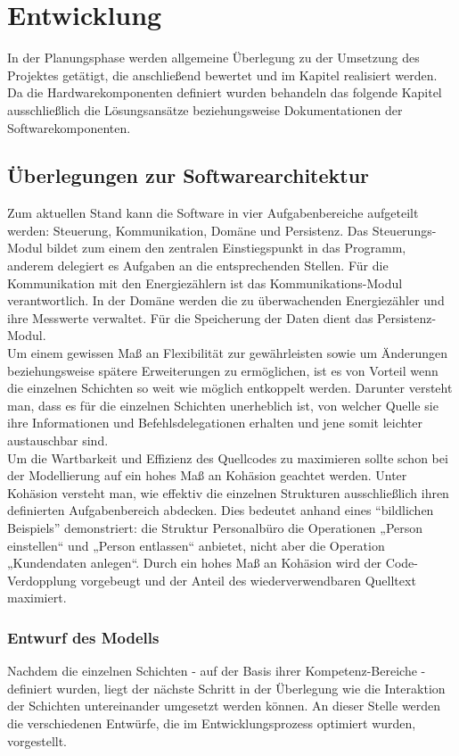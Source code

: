 \documentclass[Bachelorarbeit.tex]{subfiles}
\begin{document}
\chapter{Entwicklung}
In der Planungsphase werden allgemeine Überlegung zu der Umsetzung 
des Projektes getätigt, die anschließend bewertet und im Kapitel 
 realisiert werden. Da die Hardwarekomponenten definiert wurden 
behandeln das folgende Kapitel ausschließlich die Lösungsansätze 
beziehungsweise Dokumentationen der Softwarekomponenten.

\section{Überlegungen zur Softwarearchitektur}
Zum aktuellen Stand kann die Software in vier Aufgabenbereiche aufgeteilt werden: 
Steuerung, Kommunikation, Domäne und Persistenz. Das Steuerungs-Modul bildet zum einem
den zentralen Einstiegspunkt in das Programm, anderem delegiert es Aufgaben an die 
entsprechenden Stellen. Für die Kommunikation mit den Energiezählern ist das 
Kommunikations-Modul verantwortlich. In der Domäne werden die zu 
überwachenden Energiezähler und ihre Messwerte verwaltet. Für die Speicherung 
der Daten dient das Persistenz-Modul.\\
%
Um einem gewissen Maß an Flexibilität zur gewährleisten sowie um Änderungen  
beziehungsweise spätere Erweiterungen zu ermöglichen, ist es von Vorteil wenn die einzelnen Schichten so weit wie möglich entkoppelt werden. 
Darunter versteht man, dass es für die einzelnen Schichten unerheblich ist, von welcher Quelle sie ihre Informationen und Befehlsdelegationen erhalten und jene somit leichter austauschbar sind. \\
%
Um die Wartbarkeit und Effizienz des Quellcodes zu maximieren 
sollte schon bei der Modellierung auf ein hohes Maß an Kohäsion geachtet 
werden. Unter Kohäsion versteht man, wie effektiv die einzelnen 
Strukturen ausschließlich ihren definierten Aufgabenbereich abdecken. Dies 
bedeutet anhand eines "`bildlichen Beispiels"' demonstriert: die Struktur 
Personalbüro die Operationen „Person einstellen“ und „Person entlassen“ 
anbietet, nicht aber die Operation „Kundendaten anlegen“. 
Durch ein hohes Maß an Kohäsion wird der Code-Verdopplung vorgebeugt und 
der Anteil des wiederverwendbaren Quelltext maximiert. \\

\subsection{Entwurf des Modells }
Nachdem die einzelnen Schichten - auf der Basis ihrer Kompetenz-Bereiche - definiert wurden, liegt der nächste Schritt in der Überlegung wie die Interaktion der Schichten untereinander umgesetzt werden können. 
An dieser Stelle werden die verschiedenen Entwürfe, die im Entwicklungsprozess optimiert wurden, vorgestellt. 
\end{document}
